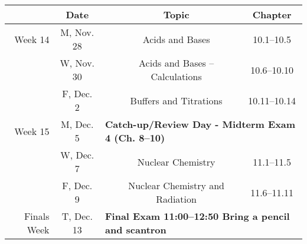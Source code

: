 \documentclass[12pt, letterpaper]{article}
\begin{document}
\noindent\begin{tabular}{rcccc}
	       & Date       &                                                                              & Topic                                               & Chapter    \\
	\midrule
	Week 14     & M, Nov. 28 &                                                                                  & Acids and Bases                    & 10.1--10.5   \\
	            & W, Nov. 30 &                                                                                  & Acids and Bases -- Calculations    & 10.6--10.10  \\
	            & F, Dec. 2  &                                                                                  & Buffers and Titrations             & 10.11--10.14 \\
	\midrule
	Week 15     & M, Dec. 5  & \multicolumn{3}{l}{\textbf{Catch-up/Review Day - Midterm Exam 4 (Ch. 8--10)}}                                                        \\
	            & W, Dec. 7  &                                                                                  & Nuclear Chemistry                  & 11.1--11.5   \\
	            & F, Dec. 9  &                                                                                  & Nuclear Chemistry and Radiation    & 11.6--11.11  \\
	\midrule
	Finals Week & T, Dec. 13 & \multicolumn{3}{l}{\textbf{Final Exam 11:00--12:50 Bring a pencil and scantron}}                                                     \\
\end{tabular}
~
\end{document}

